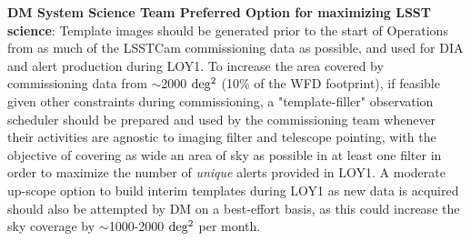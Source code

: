 \documentclass[DM,lsstdraft,toc]{lsstdoc}
\begin{document}
{\bf DM System Science Team Preferred Option for maximizing LSST science}: Template images should be generated prior to the start of Operations from as much of the LSSTCam commissioning data as possible, and used for DIA and alert production during LOY1.
To increase the area covered by commissioning data from $\sim$2000 $\rm deg^2$ (10\% of the WFD footprint), if feasible given other constraints during commissioning, a "template-filler" observation scheduler should be prepared and used by the commissioning team whenever their activities are agnostic to imaging filter and telescope pointing, with the objective of covering as wide an area of sky as possible in at least one filter in order to maximize the number of {\em unique} alerts provided in LOY1.
A moderate up-scope option to build interim templates during LOY1 as new data is acquired should also be attempted by DM on a best-effort basis, as this could increase the sky coverage by $\sim$1000-2000 $\rm deg^2$ per month.

\clearpage

\end{document}
